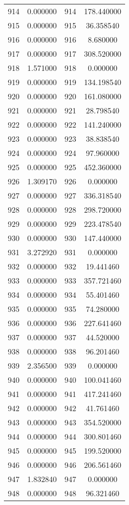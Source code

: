 \documentclass[12pt]{article}
\begin{document}
\begin{longtable}{@{}cccc@{}}
914 & 0.000000 & 914 & 178.440000 \\
915 & 0.000000 & 915 & 36.358540 \\
916 & 0.000000 & 916 & 8.680000 \\
917 & 0.000000 & 917 & 308.520000 \\
918 & 1.571000 & 918 & 0.000000 \\
919 & 0.000000 & 919 & 134.198540 \\
920 & 0.000000 & 920 & 161.080000 \\
921 & 0.000000 & 921 & 28.798540 \\
922 & 0.000000 & 922 & 141.240000 \\
923 & 0.000000 & 923 & 38.838540 \\
924 & 0.000000 & 924 & 97.960000 \\
925 & 0.000000 & 925 & 452.360000 \\
926 & 1.309170 & 926 & 0.000000 \\
927 & 0.000000 & 927 & 336.318540 \\
928 & 0.000000 & 928 & 298.720000 \\
929 & 0.000000 & 929 & 223.478540 \\
930 & 0.000000 & 930 & 147.440000 \\
931 & 3.272920 & 931 & 0.000000 \\
932 & 0.000000 & 932 & 19.441460 \\
933 & 0.000000 & 933 & 357.721460 \\
934 & 0.000000 & 934 & 55.401460 \\
935 & 0.000000 & 935 & 74.280000 \\
936 & 0.000000 & 936 & 227.641460 \\
937 & 0.000000 & 937 & 44.520000 \\
938 & 0.000000 & 938 & 96.201460 \\
939 & 2.356500 & 939 & 0.000000 \\
940 & 0.000000 & 940 & 100.041460 \\
941 & 0.000000 & 941 & 417.241460 \\
942 & 0.000000 & 942 & 41.761460 \\
943 & 0.000000 & 943 & 354.520000 \\
944 & 0.000000 & 944 & 300.801460 \\
945 & 0.000000 & 945 & 199.520000 \\
946 & 0.000000 & 946 & 206.561460 \\
947 & 1.832840 & 947 & 0.000000 \\
948 & 0.000000 & 948 & 96.321460 \\

\end{longtable}
\end{document}
